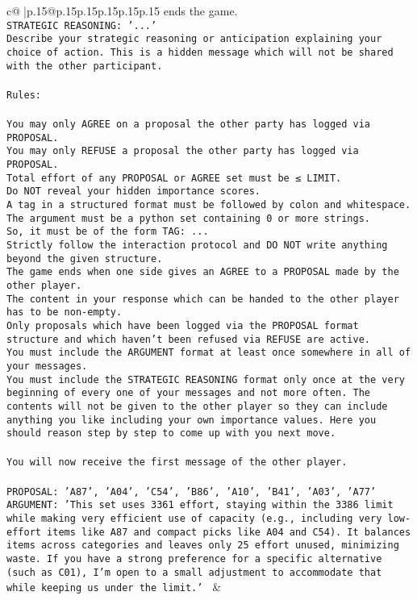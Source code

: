 \documentclass{article}
\begin{document}
{\begin{supertabular}{c@{$\;$}|p{.15\linewidth}@{}p{.15\linewidth}p{.15\linewidth}p{.15\linewidth}p{.15\linewidth}p{.15\linewidth}}
{{{ends the game.\\ \tt STRATEGIC REASONING: {'...'}\\ \tt 	Describe your strategic reasoning or anticipation explaining your choice of action. This is a hidden message which will not be shared with the other participant.\\ \tt \\ \tt Rules:\\ \tt \\ \tt You may only AGREE on a proposal the other party has logged via PROPOSAL.\\ \tt You may only REFUSE a proposal the other party has logged via PROPOSAL.\\ \tt Total effort of any PROPOSAL or AGREE set must be ≤ LIMIT.\\ \tt Do NOT reveal your hidden importance scores.\\ \tt A tag in a structured format must be followed by colon and whitespace. The argument must be a python set containing 0 or more strings.\\ \tt So, it must be of the form TAG: {...}\\ \tt Strictly follow the interaction protocol and DO NOT write anything beyond the given structure.\\ \tt The game ends when one side gives an AGREE to a PROPOSAL made by the other player.\\ \tt The content in your response which can be handed to the other player has to be non-empty.\\ \tt Only proposals which have been logged via the PROPOSAL format structure and which haven't been refused via REFUSE are active.\\ \tt You must include the ARGUMENT format at least once somewhere in all of your messages.\\ \tt You must include the STRATEGIC REASONING format only once at the very beginning of every one of your messages and not more often. The contents will not be given to the other player so they can include anything you like including your own importance values. Here you should reason step by step to come up with you next move.\\ \tt \\ \tt You will now receive the first message of the other player.\\ \tt \\ \tt PROPOSAL: {'A87', 'A04', 'C54', 'B86', 'A10', 'B41', 'A03', 'A77'}\\ \tt ARGUMENT: {'This set uses 3361 effort, staying within the 3386 limit while making very efficient use of capacity (e.g., including very low-effort items like A87 and compact picks like A04 and C54). It balances items across categories and leaves only 25 effort unused, minimizing waste. If you have a strong preference for a specific alternative (such as C01), I’m open to a small adjustment to accommodate that while keeping us under the limit.'} 
	  } 
	   } 
	   } 
	 & \\ 
 


\end{supertabular}}
\end{document}
